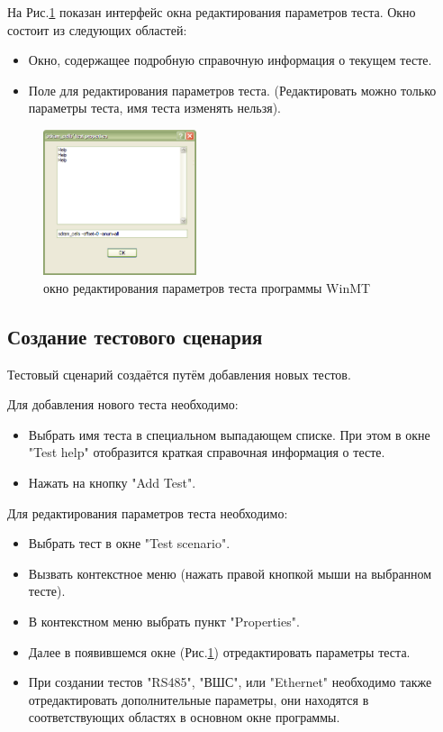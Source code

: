 \documentclass[a4paper,14pt,bachelor]{disser}
\begin{document}
На Рис.\ref{winmt-2} показан интерфейс окна редактирования параметров теста. Окно состоит из следующих областей:
\begin{itemize}
	\item Окно, содержащее подробную справочную информация о текущем тесте.
	\item Поле для редактирования параметров теста. (Редактировать можно только параметры теста, имя теста изменять нельзя).
\end{itemize}

\begin{figure}[h!]
\addtocounter{myfigs}{1}
\begin{center}
	\includegraphics[width=0.4\textwidth]{winmt-2}
	\caption{\label{winmt-2} окно редактирования параметров теста программы WinMT}
\end{center}
\end{figure}

\subsection{Создание тестового сценария}
Тестовый сценарий создаётся путём добавления новых тестов. 

Для добавления нового теста необходимо:
\begin{itemize}
	\item Выбрать имя теста в специальном выпадающем списке. При этом в окне "Test help" отобразится краткая справочная информация о тесте.
	\item Нажать на кнопку "Add Test".
\end{itemize}

Для редактирования параметров теста необходимо:
\begin{itemize}
	\item Выбрать тест в окне "Test scenario".
	\item Вызвать контекстное меню (нажать правой кнопкой мыши на выбранном тесте).
	\item В контекстном меню выбрать пункт "Properties".
	\item Далее в появившемся окне (Рис.\ref{winmt-2}) отредактировать параметры теста.
	\item При создании тестов "RS485", "ВШС", или "Ethernet" необходимо также отредактировать дополнительные параметры, они находятся в соответствующих областях в основном окне программы.
\end{itemize}
\end{document}
